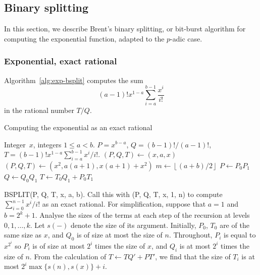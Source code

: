 \documentclass[a4paper,11pt]{article}
\theoremstyle{definition}
\providecommand{\floor}[1]{\left\lfloor#1\right\rfloor}%
\begin{document}
\subsection{Binary splitting}

In this section, we describe Brent's binary splitting, or bit-burst algorithm 
for computing the exponential function, adapted to the $p$-adic case.

\subsubsection{Exponential, exact rational}

Algorithm~\ref{alg:exp-bsplit} computes the sum 
\begin{equation}
(a-1)! x^{1-a} \sum_{i=a}^{b-1} \frac{x^i}{i!}
\end{equation}
in the rational number $T/Q$.

\begin{algorithm}
\caption{Computing the exponential as an exact rational}
\label{alg:exp-bsplit}
\begin{algorithmic}
\vspace{1mm}
\Require Integer~$x$, integers $1 \leq a < b$.
\Ensure  $P = x^{b-a}$, $Q = (b-1)! / (a-1)!$, $T = (b-1)! x^{1-a} \sum_{i=a}^{b-1} x^i / i!$.
\State $(P, Q, T) \gets (x, a, x)$
\State $(P, Q, T) \gets (x^2, a (a + 1), x (a + 1) + x^2)$
\Else
\State $m \gets \floor{(a + b) / 2}$
\State {}
\State {}
\State $P \gets P_0 P_1$
\State $Q \gets Q_0 Q_1$
\State $T \gets T_0 Q_1 + P_0 T_1$
\EndIf
\EndProcedure
\end{algorithmic}
\end{algorithm}

BSPLIT(P, Q, T, x, a, b).  Call this with (P, Q, T, x, 1, n) to compute 
$\sum_{i=0}^{n-1} x^i / i!$ as an exact rational.  For simplification, suppose 
that $a = 1$ and $b = 2^k + 1$.  Analyse the sizes of the terms at each 
step of the recursion at levels $0, 1, \dotsc, k$.  Let $s(-)$ denote 
the size of its argument.  Initially, $P_0$, $T_0$ are of the same size 
as $x$, and $Q_0$ is of size at most the size of $n$.  Throughout, 
$P_i$ is equal to $x^{2^i}$ so $P_i$ is of size at most $2^i$ times the 
size of $x$, and $Q_i$ is at most $2^i$ times the size of $n$.  From the 
calculation of $T \gets T Q' + P T'$, we find that the size of $T_i$ 
is at most $2^i \max\{s(n), s(x)\} + i$.
\end{document}
